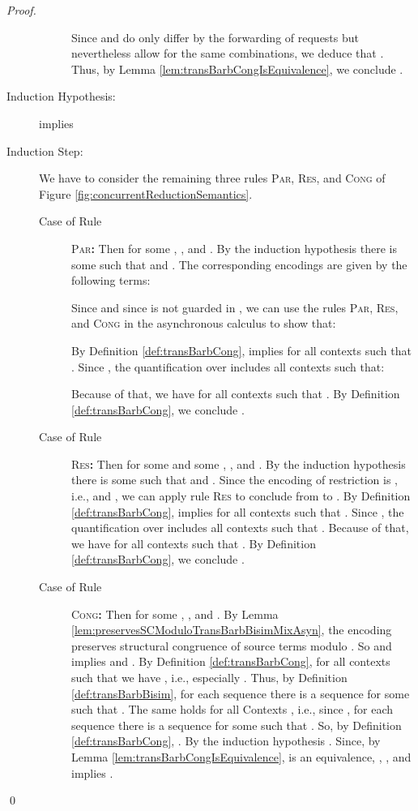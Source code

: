 \documentclass[]{llncs}
\begin{document}
\begin{proof}
\begin{description}
\begin{description}
					Since  and  do only differ by the forwarding of requests but nevertheless allow for the same combinations, we deduce that . Thus, by Lemma \ref{lem:transBarbCongIsEquivalence}, we conclude .
			\end{description}
		\item[Induction Hypothesis:]  implies 
		\item[Induction Step:] We have to consider the remaining three rules \textsc{Par}, \textsc{Res}, and \textsc{Cong} of Figure \ref{fig:concurrentReductionSemantics}.
			\begin{description}
				\item[Case of Rule] \textsc{Par}\textbf{:} Then  for some , , and . By the induction hypothesis there is some  such that  and . The corresponding encodings are given by the following terms:
					
					Since  and since  is not guarded in , we can use the rules \textsc{Par}, \textsc{Res}, and \textsc{Cong} in the asynchronous calculus to show that:
					
					By Definition \ref{def:transBarbCong},  implies  for all contexts  such that . Since , the quantification over  includes all contexts  such that:
					
					Because of that, we have  for all contexts  such that . By Definition \ref{def:transBarbCong}, we conclude .
				\item[Case of Rule] \textsc{Res}\textbf{:} Then  for some  and some , , and . By the induction hypothesis there is some  such that  and . Since the encoding of restriction is \clean, i.e.,  and , we can apply rule \textsc{Res} to conclude from  to . By Definition \ref{def:transBarbCong},  implies  for all contexts  such that . Since , the quantification over  includes all contexts  such that . Because of that, we have  for all contexts  such that . By Definition \ref{def:transBarbCong}, we conclude .
				\item[Case of Rule] \textsc{Cong}\textbf{:} Then  for some , , and . By Lemma \ref{lem:preservesSCModuloTransBarbBisimMixAsyn}, the encoding  preserves structural congruence of source terms modulo . So  and  implies  and . By Definition \ref{def:transBarbCong}, for all contexts  such that  we have , i.e., especially . Thus, by Definition \ref{def:transBarbBisim}, for each sequence  there is a sequence  for some  such that . The same holds for all Contexts , i.e., since , for each sequence  there is a sequence  for some  such that . So, by Definition \ref{def:transBarbCong}, . By the induction hypothesis . Since, by Lemma \ref{lem:transBarbCongIsEquivalence},  is an equivalence, , , and  implies .
			\end{description}
	\end{description}
	\qed
\end{proof}
\end{document}
